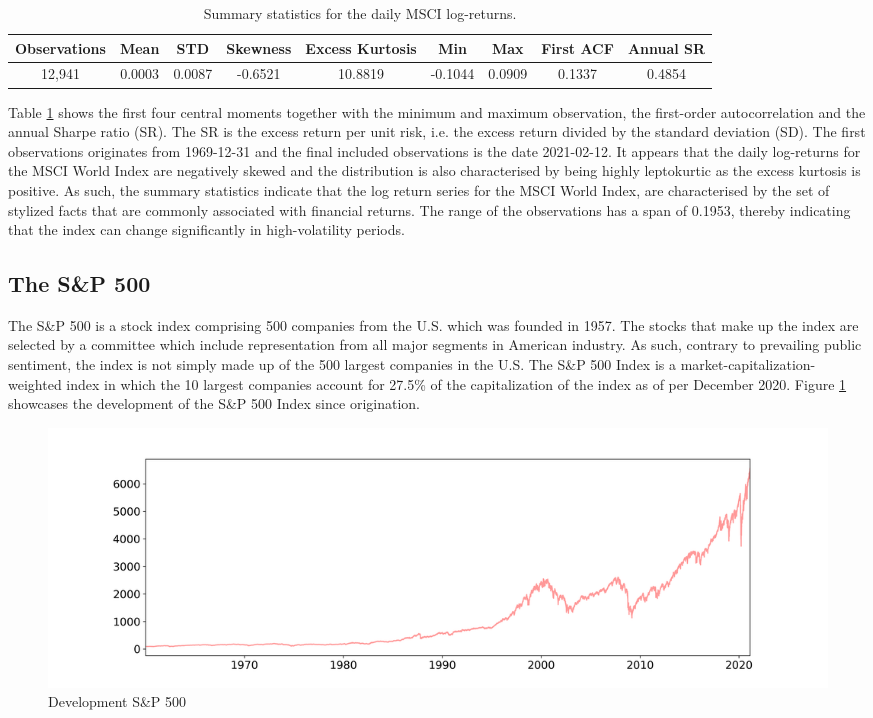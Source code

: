 \begin{table}[H]
\caption{Summary statistics for the daily MSCI log-returns.}
\centering
\begin{tabular}{c c c c c c c c c} 
\hline\hline
Observations & Mean & STD & Skewness & Excess Kurtosis & Min & Max & First ACF & Annual SR \\
\hline
12,941 & 0.0003 & 0.0087 & -0.6521 & 10.8819 & -0.1044 & 0.0909 & 0.1337 & 0.4854 \\
\hline
\end{tabular}
\label{tab:summary_stats_MSCI}
\end{table}

Table \ref{tab:summary_stats_MSCI} shows the first four central moments together with the minimum and maximum observation, the first-order autocorrelation and the annual Sharpe ratio (SR). The SR is the excess return per unit risk, i.e. the excess return divided by the standard deviation (SD). The first observations originates from 1969-12-31 and the final included observations is the date 2021-02-12. It appears that the daily log-returns for the MSCI World Index are negatively skewed and the distribution is also characterised by being highly leptokurtic as the excess kurtosis is positive. As such, the summary statistics indicate that the log return series for the MSCI World Index, are characterised by the set of stylized facts that are commonly associated with financial returns. The range of the observations has a span of 0.1953, thereby indicating that the index can change significantly in high-volatility periods.    
 
\subsection{The S\&P 500}
The S\&P 500 is a stock index comprising 500 companies from the U.S. which was founded in 1957. The stocks that make up the index are selected by a committee which include representation from all major segments in American industry. As such, contrary to prevailing public sentiment, the index is not simply made up of the 500 largest companies in the U.S. The S\&P 500 Index is a market-capitalization-weighted index in which the 10 largest companies account for 27.5\% of the capitalization of the index as of per December 2020. Figure \ref{fig: SP500_index} showcases the development of the S\&P 500 Index since origination. 
 
\begin{figure}[H] 
    \centering
    \includegraphics[width=1\textwidth]{analysis/data_description/SP500_index.png}
    \caption{Development S\&P 500}
    \label{fig: SP500_index}
\end{figure}

